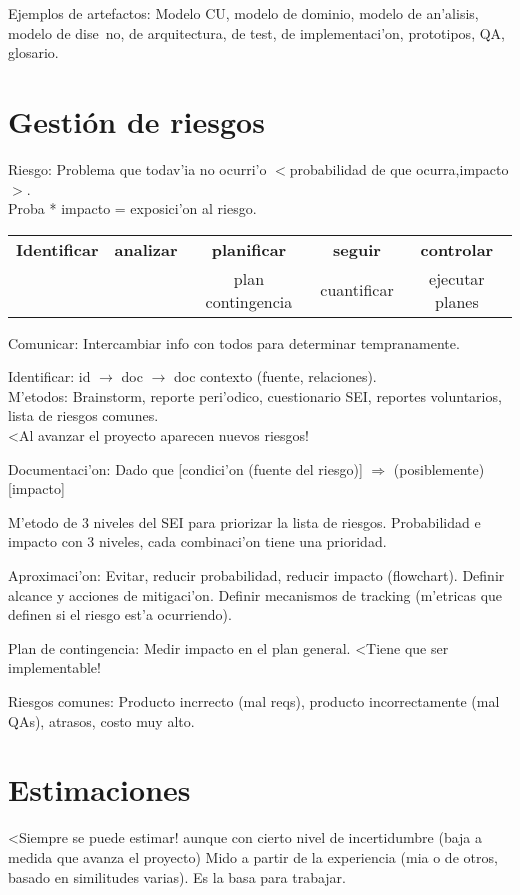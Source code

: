 \documentclass[a4paper,spanish]{article}
\newcommand{\tab}[0]{\hspace*{0.5cm}}
\begin{document}
Ejemplos de artefactos: Modelo CU, modelo de dominio, modelo de an'alisis, 
	modelo de dise~no, de arquitectura, de test, de implementaci'on, 
	prototipos, QA, glosario.
	
\section{Gesti\'on de riesgos}

Riesgo: Problema que todav'ia no ocurri'o 
	$<$probabilidad de que ocurra,impacto$>$. \\
\tab Proba * impacto = exposici'on al riesgo.

\begin{tabular}{ccccc}
\textbf{Identificar} & \textbf{analizar} & \textbf{planificar} & 
	\textbf{seguir} & \textbf{controlar} \\
& & plan contingencia & cuantificar & ejecutar planes
\end{tabular}

Comunicar: Intercambiar info con todos para determinar tempranamente.

Identificar: id $\rightarrow$ doc $\rightarrow$ doc contexto (fuente, 
	relaciones). \\
\tab M'etodos: Brainstorm, reporte peri'odico, cuestionario SEI, reportes
	voluntarios, lista de riesgos comunes. \\
\tab <Al avanzar el proyecto aparecen nuevos riesgos!

Documentaci'on: Dado que [condici'on (fuente del riesgo)] $\Rightarrow$ 
	(posiblemente) [impacto]
	
M'etodo de 3 niveles del SEI para priorizar la lista de riesgos. Probabilidad
	e impacto con 3 niveles, cada combinaci'on tiene una prioridad.

Aproximaci'on: Evitar, reducir probabilidad, reducir impacto (flowchart). 
	Definir alcance y acciones de mitigaci'on. Definir mecanismos de tracking
	(m'etricas que definen si el riesgo est'a ocurriendo).
	
Plan de contingencia: Medir impacto en el plan general. <Tiene que ser 
	implementable!

Riesgos comunes: Producto incrrecto (mal reqs), producto incorrectamente (mal
	QAs), atrasos, costo muy alto.
	
\section{Estimaciones}

<Siempre se puede estimar! aunque con cierto nivel de incertidumbre (baja a
	medida que avanza el proyecto)
\tab Mido a partir de la experiencia (mia o de otros, basado en similitudes
	varias). Es la basa para trabajar.
\end{document}
